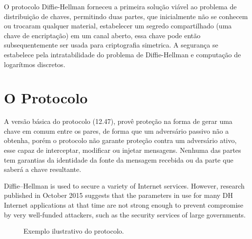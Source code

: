 \documentclass{article}
\begin{document}
O protocolo Diffie-Hellman forneceu a primeira solução viável ao problema
de distribuição de chaves, permitindo duas partes, que inicialmente não se
conhecem ou trocaram qualquer material, estabelecer um segredo compartilhado
(uma chave de encriptação) em um canal aberto, essa chave pode então
subsequentemente ser usada para criptografia simetrica. A segurança se
estabelece pela intratabilidade do problema de Diffie-Hellman e computação de
logarítmos discretos\cite{katz1996handbook}.

\section{O Protocolo}%
\label{sec:o_protocolo}



A versão básica do protocolo (12.47), provê proteção na forma de gerar uma
chave em comum entre os pares, de forma que um adversário passivo não a obtenha,
porém o protocolo não garante proteção contra um adversário ativo, esse capaz
de interceptar, modificar ou injetar mensagens. Nenhuma das partes tem
garantias da identidade da fonte da mensagem recebida ou da parte que saberá
a chave resultante.

Diffie–Hellman is used to secure a variety of Internet services. However, research published in October 2015 suggests that the parameters in use for many DH Internet applications at that time are not strong enough to prevent compromise by very well-funded attackers, such as the security services of large governments.

\begin{figure}[htpb]
    \centering
    
    \caption{Exemplo ilustrativo do protocolo.}%
    \label{fig:diagram}
\end{figure}



\end{document}
